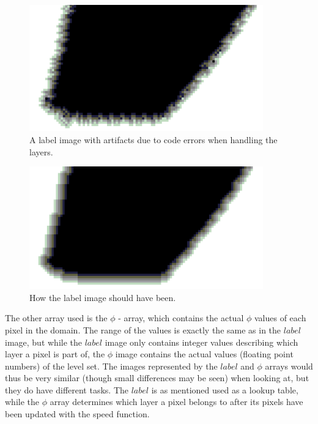\begin{figure}[h!]
\centering
\includegraphics[width=0.90\textwidth]{implemented/labelFailedEx}
\caption{A label image with artifacts due to code errors when handling the layers.}
\label{labelFailedEx}
\end{figure}

\begin{figure}[h!]
\centering
\includegraphics[width=0.90\textwidth]{implemented/labelOkEx}
\caption{How the label image should have been.}
\label{labelOkEx}
\end{figure}

The other array used is the $\phi$ - array, which contains the actual $\phi$ values of each pixel in the domain. The range of the values is exactly the same as in the $label$ image, but while the $label$ image only contains integer values describing which layer a pixel is part of, the $\phi$ image contains the actual values (floating point numbers) of the level set. The images represented by the $label$ and $\phi$ arrays would thus be very similar (though small differences may be seen) when looking at, but they do have different tasks. The $label$ is as mentioned used as a lookup table, while the $\phi$ array determines which layer a pixel belongs to after its pixels have been updated with the speed function.

